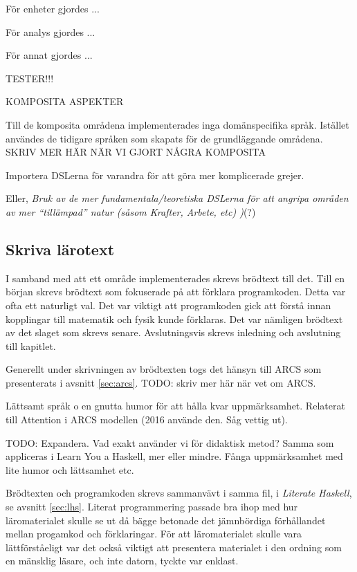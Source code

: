 \begin{binge}
För enheter gjordes ...

För analys gjordes ...

För annat gjordes ...


TESTER!!!

KOMPOSITA ASPEKTER

Till de komposita områdena implementerades inga domänspecifika språk. Istället användes de tidigare språken som skapats för de grundläggande områdena. SKRIV MER HÄR NÄR VI GJORT NÅGRA KOMPOSITA

Importera DSLerna för varandra för att göra mer komplicerade grejer.

Eller, \emph{Bruk av de mer fundamentala/teoretiska DSLerna för att
  angripa områden av mer ``tillämpad'' natur (såsom Krafter, Arbete,
  etc) )}(?)

\subsection{Skriva lärotext}

I samband med att ett område implementerades skrevs brödtext till det. Till en början skrevs brödtext som fokuserade på att förklara programkoden. Detta var ofta ett naturligt val. Det var viktigt att programkoden gick att förstå innan kopplingar till matematik och fysik kunde förklaras. Det var nämligen brödtext av det slaget som skrevs senare. Avslutningsvis skrevs inledning och avslutning till kapitlet.

Generellt under skrivningen av brödtexten togs det hänsyn till ARCS som presenterats i avsnitt \ref{sec:arcs}. TODO: skriv mer här när vet om ARCS.

Lättsamt språk o en gnutta humor för att hålla kvar
uppmärksamhet. Relaterat till Attention i ARCS modellen (2016
använde den. Såg vettig ut).

TODO: Expandera. Vad exakt använder vi för didaktisk metod? Samma
som appliceras i Learn You a Haskell, mer eller mindre. Fånga
uppmärksamhet med lite humor och lättsamhet etc.

Brödtexten och programkoden skrevs sammanvävt i samma fil, i \textit{Literate Haskell}, se avsnitt \ref{sec:lhs}. Literat programmering passade bra ihop med hur läromaterialet skulle se ut då bägge betonade det jämnbördiga förhållandet mellan progamkod och förklaringar. För att läromaterialet skulle vara lättförståeligt var det också viktigt att presentera materialet i den ordning som en mänsklig läsare, och inte datorn, tyckte var enklast.


\end{binge}
